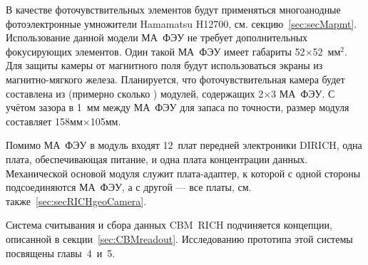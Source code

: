 В качестве фоточувствительных элементов будут применяться многоанодные фотоэлектронные умножители Hamamatsu H12700, см. секцию~\ref{sec:secMapmt}. Использование данной модели МА~ФЭУ не требует дополнительных фокусирующих элементов.
Один такой МА~ФЭУ имеет габариты 52$\times$52~мм$^2$. Для защиты камеры от магнитного поля будут использоваться экраны из магнитно-мягкого железа.
Планируется, что фоточувствительная камера будет составлена из (примерно сколько \todo) модулей, содержащих 2$\times$3 МА~ФЭУ. С учётом зазора в 1~мм между МА~ФЭУ для запаса по точности, размер модуля составляет 158мм$\times$105мм.


Помимо МА~ФЭУ в модуль входят 12~плат передней электроники DIRICH, одна плата, обеспечивающая питание, и одна плата концентрации данных. Механической основой модуля служит плата-адаптер, к которой с одной стороны подсоединяются МА~ФЭУ, а с другой --- все платы, см. также~\ref{sec:secRICHgeoCamera}. 



Система считывания и сбора данных CBM~RICH подчиняется концепции, описанной в секции~\ref{sec:CBMreadout}. Исследованию прототипа этой системы посвящены главы~4~и~5.

